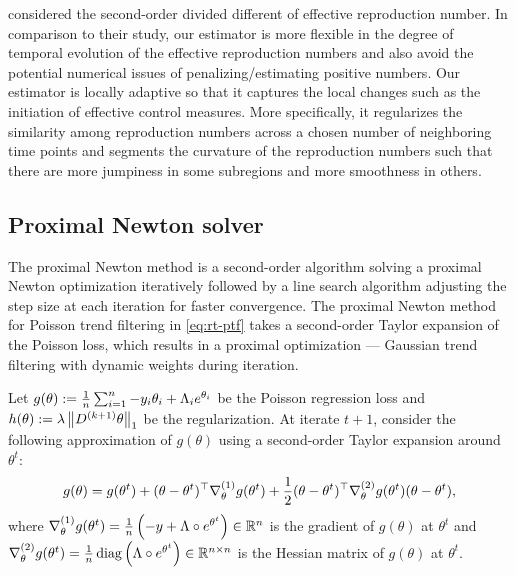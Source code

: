 \cite{pascal2022nonsmooth} considered the second-order divided different of effective reproduction number. In comparison to their study, our estimator is more flexible in the degree of temporal evolution of the effective reproduction numbers and also avoid the potential numerical issues of penalizing/estimating positive numbers. 
Our estimator is locally adaptive so that it captures the local changes such as the initiation of effective control measures. More specifically, it regularizes the similarity among reproduction numbers across a chosen number of neighboring time points and segments the curvature of the reproduction numbers such that there are more jumpiness in some subregions and more smoothness in others. 

\subsection{Proximal Newton solver} %

The proximal Newton method is a second-order algorithm solving a proximal Newton optimization iteratively followed by a line search algorithm adjusting the step size at each iteration for faster convergence. The proximal Newton method for Poisson trend filtering in \eqref{eq:rt-ptf} takes a second-order Taylor expansion of the Poisson loss, which results in a proximal optimization --- Gaussian trend filtering with dynamic weights during iteration. 

Let $g(\theta):= \frac{1}{n} \sum_{i=1}^n -y_i\theta_i + \Lambda_i e^{\theta_i}$ be the Poisson regression loss and $h(\theta) := \lambda \left\lVert D^{(k+1)} \theta \right\rVert_1$ be the regularization. At iterate $t+1$, consider the following approximation of $g(\theta)$ using a second-order Taylor expansion around $\theta^t$: 
$$ g(\theta) = g(\theta^t) + (\theta - \theta^t)^{\top} \nabla^{(1)}_{\theta} g(\theta^t) + \frac{1}{2} (\theta - \theta^t)^{\top} \nabla^{(2)}_{\theta} g(\theta^t) (\theta - \theta^t), $$
where $\nabla^{(1)}_{\theta} g(\theta^t) = \frac{1}{n} \left(-y + \Lambda\circ e^{\theta^t}\right) \in \mathbb{R}^n$ is the gradient of $g(\theta)$ at $\theta^t$ and $\nabla^{(2)}_{\theta} g(\theta^t) = \frac{1}{n}\operatorname*{diag} \left(\Lambda \circ e^{\theta^t}\right) \in \mathbb{R}^{n\times n}$ is the Hessian matrix of $g(\theta)$ at $\theta^t$. %

